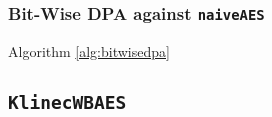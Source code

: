 \subsubsection{Bit-Wise DPA against {\tt naiveAES}}
	
	Algorithm \ref{alg:bitwisedpa}
	



\subsection{\tt KlinecWBAES}
\label{sec:klinecwbaes}




